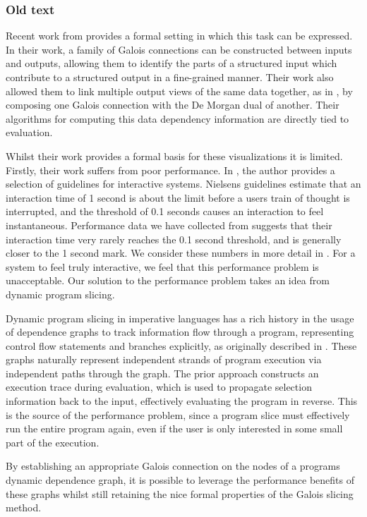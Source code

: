 
\subsubsection{Old text}

Recent work from \citet{perera22} provides a formal setting in which this task
can be expressed. In their work, a family of Galois connections can be constructed 
between inputs and outputs, allowing them to
identify the parts of a structured input which contribute to a structured output in
a fine-grained manner. Their work also allowed them to link multiple output views
of the same data together, as in , by composing one Galois
connection with the De Morgan dual of another. Their algorithms for computing this
data dependency information are directly tied to evaluation.

Whilst their work provides a formal basis for these visualizations it is limited.
Firstly, their work suffers from poor performance. In \citet{nielsen93}, the author
provides a selection of guidelines for interactive systems. Nielsens guidelines
estimate that an interaction time of 1 second is about the limit before a users
train of thought is interrupted, and the threshold of 0.1 seconds causes an interaction
to feel instantaneous. Performance data we have collected from \citet{perera22} suggests
that their interaction time very rarely reaches the 0.1 second threshold, and is
generally closer to the 1 second mark. We consider these numbers in more detail in
. For a system to feel truly interactive, we feel that this
performance problem is unacceptable. Our solution to the performance problem
takes an idea from dynamic program slicing. 

Dynamic program slicing in imperative languages has a rich history in the usage of
dependence graphs to track information flow through a program, representing control
flow statements and branches explicitly, as originally described in \citet{agrawal90}.
These graphs naturally represent independent strands of program execution via independent
paths through the graph. The prior approach constructs an execution trace during evaluation,
which is used to propagate selection information back to the input, effectively evaluating
the program in reverse. This is the source of the performance problem, since a
program slice must effectively run the entire program again, even if the user is
only interested in some small part of the execution.

By establishing an appropriate Galois connection on the nodes of a programs dynamic
dependence graph, it is possible to leverage the performance benefits of these graphs
whilst still retaining the nice formal properties of the Galois slicing method.



